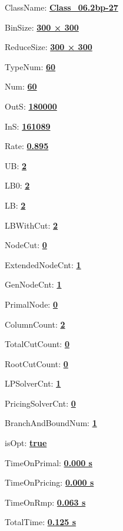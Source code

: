 \documentclass[11pt]{article}
\begin{document}
\pagestyle{empty}


ClassName: \underline{\textbf{Class_06.2bp-27}}
\par
BinSize: \underline{\textbf{300 × 300}}
\par
ReduceSize: \underline{\textbf{300 × 300}}
\par
TypeNum: \underline{\textbf{60}}
\par
Num: \underline{\textbf{60}}
\par
OutS: \underline{\textbf{180000}}
\par
InS: \underline{\textbf{161089}}
\par
Rate: \underline{\textbf{0.895}}
\par
UB: \underline{\textbf{2}}
\par
LB0: \underline{\textbf{2}}
\par
LB: \underline{\textbf{2}}
\par
LBWithCut: \underline{\textbf{2}}
\par
NodeCut: \underline{\textbf{0}}
\par
ExtendedNodeCnt: \underline{\textbf{1}}
\par
GenNodeCnt: \underline{\textbf{1}}
\par
PrimalNode: \underline{\textbf{0}}
\par
ColumnCount: \underline{\textbf{2}}
\par
TotalCutCount: \underline{\textbf{0}}
\par
RootCutCount: \underline{\textbf{0}}
\par
LPSolverCnt: \underline{\textbf{1}}
\par
PricingSolverCnt: \underline{\textbf{0}}
\par
BranchAndBoundNum: \underline{\textbf{1}}
\par
isOpt: \underline{\textbf{true}}
\par
TimeOnPrimal: \underline{\textbf{0.000 s}}
\par
TimeOnPricing: \underline{\textbf{0.000 s}}
\par
TimeOnRmp: \underline{\textbf{0.063 s}}
\par
TotalTime: \underline{\textbf{0.125 s}}
\par
\newpage
\end{document}
